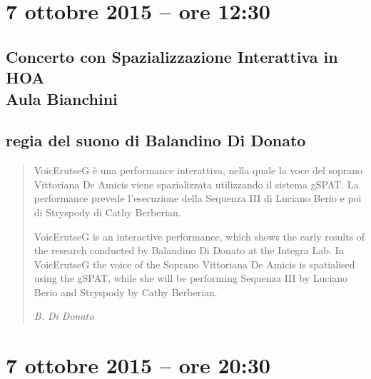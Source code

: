 \documentclass[8pt, twoside, a5paper]{extreport}
\begin{document}

\section*{7 ottobre 2015 -- ore 12:30}

\subsection*{{\small Concerto con Spazializzazione Interattiva in HOA} \\
	\textsf{Aula Bianchini}}

{\fontsize{30}{30} }

\subsection*{\textsf{regia del suono di Balandino Di Donato}}

\bigskip


\begin{quote}
{\svolk \small
VoicErutseG è una performance interattiva, nella quale la voce del soprano Vittoriana De Amicis viene spazializzata utilizzando il sistema gSPAT. La performance prevede l’esecuzione della Sequenza III di Luciano Berio e poi di Stryspody di Cathy Berberian.

VoicErutseG is an interactive performance, which shows the early results of the research conducted by Balandino Di Donato at the Integra Lab. In VoicErutseG the voice of the Soprano Vittoriana De Amicis is spatialised using the gSPAT, while she will be performing Sequenza III by Luciano Berio and Stryspody by Cathy Berberian.}

\emph{B. Di Donato}
\end{quote}    


\begin{multicols}{2}




\end{multicols}

\clearpage

\section*{7 ottobre 2015 -- ore 20:30}
\end{document}
